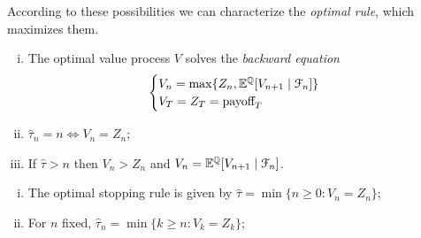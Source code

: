 According to these possibilities we can characterize the \emph{optimal rule}, which maximizes them.
\begin{theorem}
\hfill
\begin{enumerate}[i.]
    \item The optimal value process $V$ solves the \emph{backward equation}
    \begin{equation}
        \begin{cases}
        V_n = \max\{Z_n,\mathbb{E}^{\mathbb{Q}}[V_{n+1}\mid\mathcal{F}_{n}]\}\\
        V_T = Z_T = \mbox{payoff}_T
        \end{cases}
    \end{equation}
    \item $\hat{\tau}_{n}=n \Leftrightarrow V_n=Z_n$;
    \item If $\hat{\tau}>n$ then $V_n>Z_n$ and $V_n=\mathbb{E}^{\mathbb{Q}}[V_{n+1}\mid\mathcal{F}_{n}]$.
\end{enumerate}
\end{theorem}
\begin{corollary}
\hfill
\begin{enumerate}[i.]
    \item The optimal stopping rule is given by $\hat{\tau}=\min\{n\ge0:V_n=Z_n\}$;
    \item For $n$ fixed, $\hat{\tau}_n=\min\{k\ge n:V_k=Z_k\}$;
\end{enumerate}
\end{corollary}

